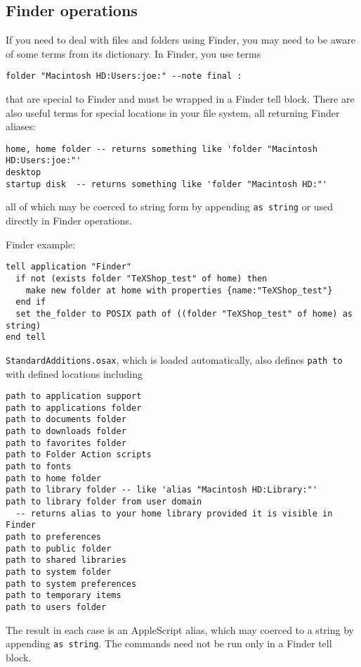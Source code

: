 \documentclass[11pt]{amsart}
\begin{document}
\subsection{Finder operations}
If you need to deal with files and folders using Finder, you may need to be aware of some terms from its dictionary. In Finder, you use terms
\begin{verbatim}
folder "Macintosh HD:Users:joe:" --note final :
\end{verbatim}
that are special to Finder and must be wrapped in a Finder tell block. There are also useful terms for special locations in your file system, all returning Finder aliases:
\begin{verbatim}
home, home folder -- returns something like 'folder "Macintosh HD:Users:joe:"'
desktop
startup disk  -- returns something like 'folder "Macintosh HD:"'
\end{verbatim} 
all of which may be coerced to string form by appending {\tt as string} or used directly in Finder operations.

Finder example:
\begin{verbatim}
tell application "Finder"
  if not (exists folder "TeXShop_test" of home) then
    make new folder at home with properties {name:"TeXShop_test"}
  end if
  set the_folder to POSIX path of ((folder "TeXShop_test" of home) as string)
end tell
\end{verbatim}
{\tt StandardAdditions.osax}, which is loaded automatically, also defines {\tt path to}   with defined locations including
\begin{verbatim}
path to application support
path to applications folder
path to documents folder
path to downloads folder
path to favorites folder
path to Folder Action scripts
path to fonts
path to home folder
path to library folder -- like 'alias "Macintosh HD:Library:"'
path to library folder from user domain 
  -- returns alias to your home library provided it is visible in Finder
path to preferences
path to public folder
path to shared libraries
path to system folder
path to system preferences
path to temporary items
path to users folder
\end{verbatim}
The result in each case is an AppleScript alias, which may coerced to a string by appending {\tt as string}. The commands need not be run only in a Finder tell block.
\end{document}
